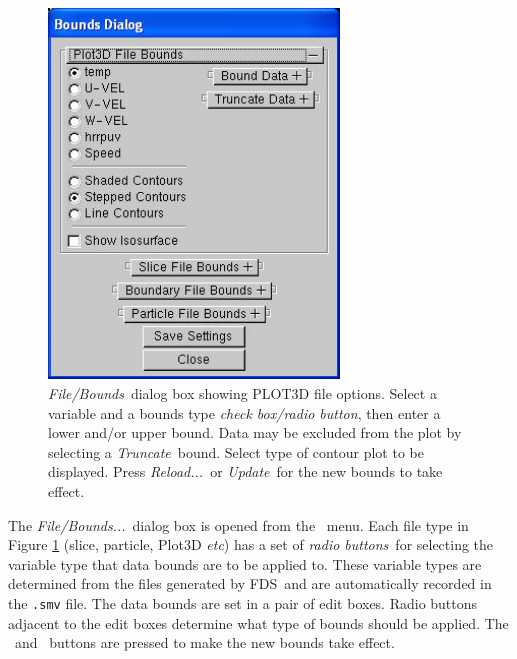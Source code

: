 \documentclass[11pt,twoside]{book}
\newcommand{\figoptions}{hbp}
\newcommand{\fds}{{FDS}}
\newcommand{\etc}{{\em etc}}
\newcommand{\frameit}[1]{\fbox{\tt #1}}
\begin{document}
\begin{figure}[\figoptions]
\centerline{
\includegraphics[width=3.0416666in]{figures/figBOUNDSplot3d}
}
\caption[{\em File/Bounds}\ dialog box showing PLOT3D file options.]
{{\em File/Bounds}\ dialog box showing PLOT3D file options. Select a
variable and a bounds type {\em check box/radio button}, then enter
a lower and/or upper bound. Data may be excluded from the plot by
selecting a {\em Truncate}\ bound.  Select type of contour plot to be
displayed. Press {\em Reload...}\ or {\em Update}\ for the new bounds to
take effect.} \label{figBOUNDSplot3d}
\end{figure}

The {\em File/Bounds...}\ dialog box is opened from the
\frameit{Dialogs}\ menu. Each file type in Figure
\ref{figBOUNDSplot3d} (slice, particle, Plot3D \etc) has a set of
{\em radio buttons}\ for selecting the variable type that data bounds
are to be applied to. These variable types are determined from the
files generated by \fds\ and are automatically recorded in the
{\tt .smv} file. The data bounds are set in a pair of edit boxes.
Radio buttons adjacent to the edit boxes determine what type of
bounds should be applied.  The \frameit{Update}\ and
\frameit{Reload}\ buttons are pressed to make the new bounds take
effect.
\end{document}
